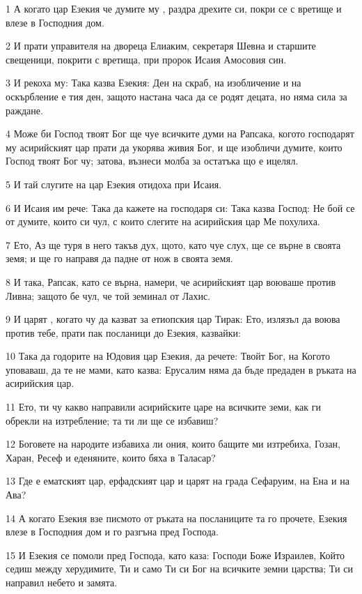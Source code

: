 \par 1 А когато цар Езекия че думите му , раздра дрехите си, покри се с вретище и влезе в Господния дом.
\par 2 И прати управителя на двореца Елиаким, секретаря Шевна и старшите свещеници, покрити с вретища, при пророк Исаия Амосовия син.
\par 3 И рекоха му: Така казва Езекия: Ден на скраб, на изобличение и на оскърбление е тия ден, защото настана часа да се родят децата, но няма сила за раждане.
\par 4 Може би Господ твоят Бог ще чуе всичките думи на Рапсака, когото господарят му асирийският цар прати да укорява живия Бог, и ще изобличи думите, които Господ твоят Бог чу; затова, възнеси молба за остатъка що е ицелял.
\par 5 И тай слугите на цар Езекия отидоха при Исаия.
\par 6 И Исаия им рече: Така да кажете на господаря си: Така казва Господ: Не бой се от думите, които си чул, с които слегите на асирийския цар Ме похулиха.
\par 7 Ето, Аз ще туря в него такъв дух, щото, като чуе слух, ще се върне в своята земя; и ще го направя да падне от нож в своята земя.
\par 8 И така, Рапсак, като се върна, намери, че асирийският цар воюваше против Ливна; защото бе чул, че той земинал от Лахис.
\par 9 И царят , когато чу да казват за етиопския цар Тирак: Ето, излязъл да воюва против тебе, прати пак посланици до Езекия, казвайки:
\par 10 Така да годорите на Юдовия цар Езекия, да речете: Твойт Бог, на Когото уповаваш, да те не мами, като казва: Ерусалим няма да бъде предаден в ръката на асирийския цар.
\par 11 Ето, ти чу какво направили асирийските царе на всичките земи, как ги обрекли на изтребление; та ти ли ще се избавиш?
\par 12 Боговете на народите избавиха ли ония, които бащите ми изтребиха, Гозан, Харан, Ресеф и еденяните, които бяха в Таласар?
\par 13 Где е ематският цар, ерфадският цар и царят на града Сефаруим, на Ена и на Ава?
\par 14 А когато Езекия взе писмото от ръката на посланиците та го прочете, Езекия влезе в Господния дом и го разгъна пред Господа.
\par 15 И Езекия се помоли пред Господа, като каза: Господи Боже Израилев, Който седиш между херудимите, Ти и само Ти си Бог на всичките земни царства; Ти си направил небето и замята.
